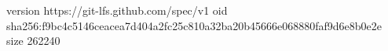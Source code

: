 version https://git-lfs.github.com/spec/v1
oid sha256:f9bc4c5146ceacea7d404a2fc25c810a32ba20b45666e068880faf9d6e8b0e2e
size 262240
